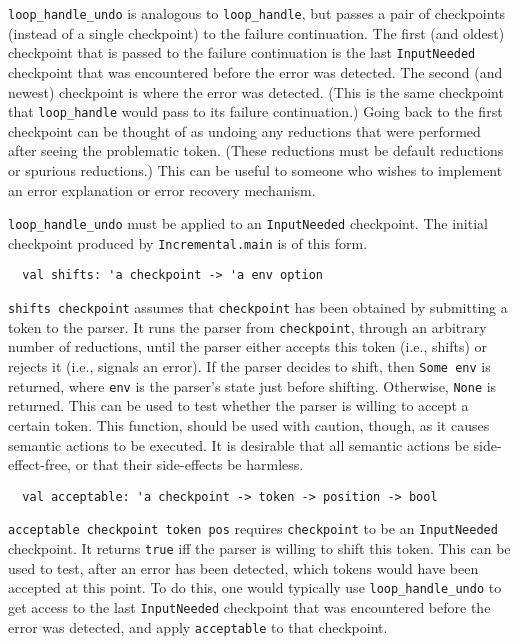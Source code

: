 \documentclass[onecolumn,11pt,nocopyrightspace,preprint]{sigplanconf}
\begin{document}
\verb+loop_handle_undo+ is analogous to \verb+loop_handle+, but passes a pair
of checkpoints (instead of a single checkpoint) to the failure continuation.
%
The first (and oldest) checkpoint that is passed to the failure continuation
is the last \verb+InputNeeded+ checkpoint that was encountered before the
error was detected. The second (and newest) checkpoint is where the error was
detected. (This is the same checkpoint that \verb+loop_handle+ would pass to
its failure continuation.) Going back to the first checkpoint can be thought
of as undoing any reductions that were performed after seeing the problematic
token. (These reductions must be default reductions or spurious reductions.)
This can be useful to someone who wishes to implement an error explanation or
error recovery mechanism.

\verb+loop_handle_undo+ must be applied to an \verb+InputNeeded+ checkpoint.
The initial checkpoint produced by \verb+Incremental.main+ is of this form.


\begin{verbatim}
  val shifts: 'a checkpoint -> 'a env option
\end{verbatim}

\verb+shifts checkpoint+ assumes that \verb+checkpoint+ has been obtained by
submitting a token to the parser. It runs the parser from \verb+checkpoint+,
through an arbitrary number of reductions, until the parser either accepts
this token (i.e., shifts) or rejects it (i.e., signals an error). If the
parser decides to shift, then \verb+Some env+ is returned, where \verb+env+ is
the parser's state just before shifting. Otherwise, \verb+None+ is returned.
This can be used to test whether the parser is willing to accept a certain
token. This function, should be used with caution, though, as it causes
semantic actions to be executed. It is desirable that all semantic actions be
side-effect-free, or that their side-effects be harmless.


\begin{verbatim}
  val acceptable: 'a checkpoint -> token -> position -> bool
\end{verbatim}

\verb+acceptable checkpoint token pos+ requires \verb+checkpoint+ to be an
\verb+InputNeeded+ checkpoint. It returns \verb+true+ iff the parser is
willing to shift this token.
%
This can be used to test, after an error has been detected, which tokens would
have been accepted at this point. To do this, one would typically use
\verb+loop_handle_undo+ to get access to the last \verb+InputNeeded+
checkpoint that was encountered before the error was detected, and apply
\verb+acceptable+ to that checkpoint.
\end{document}
